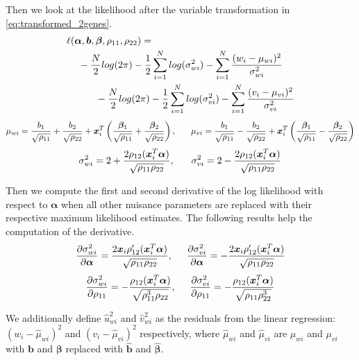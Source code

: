 \documentclass[aoas,preprint]{imsart}
\numberwithin{equation}{section}
\theoremstyle{plain}
\begin{document}
Then we look at the likelihood after the variable transformation in \ref{eq:transformed_2genes}.
\begin{equation}
\begin{multlined}
\ell(\bm{\alpha}, \bm{b}, \bm{\beta}, \rho_{11}, \rho_{22}) = \\
-\frac{N}{2} log(2\pi) - \frac{1}{2} \sum_{i=1}^{N} log (\sigma_{wi}^2) - \sum_{i=1}^{N} \frac{(w_i - \mu_{wi})^2}{\sigma_{wi}^2}\\
\hspace{7mm} -\frac{N}{2} log(2\pi) - \frac{1}{2} \sum_{i=1}^{N} log (\sigma_{vi}^2) - \sum_{i=1}^{N} \frac{(v_i - \mu_{vi})^2}{\sigma_{vi}^2}
\end{multlined}
    \label{eq:likelihood_2genes_appendix}
\end{equation}
$$\mu_{wi} = \frac{{b}_1}{\sqrt{\rho_{11}}} + \frac{{b}_2}{\sqrt{\rho_{22}}} + \bm{x}_i^T \left(\frac{\bm{\beta}_1}{\sqrt{\rho_{11}}} + \frac{\bm{\beta}_2}{\sqrt{\rho_{22}}}\right), \hspace{6mm} 
\mu_{vi} = \frac{{b}_1}{\sqrt{\rho_{11}}} - \frac{{b}_2}{\sqrt{\rho_{22}}} + \bm{x}_i^T \left(\frac{\bm{\beta}_1}{\sqrt{\rho_{11}}} - \frac{\bm{\beta}_2}{\sqrt{\rho_{22}}}\right)$$
$$\sigma_{wi}^2 = 2 + \frac{2\rho_{12}(\bm{x}_i^T \bm{\alpha})}{\sqrt{\rho_{11}\rho_{22}}}, \hspace{6mm} \sigma_{vi}^2 = 2 - \frac{2\rho_{12}(\bm{x}_i^T \bm{\alpha})}{\sqrt{\rho_{11}\rho_{22}}}$$

Then we compute the first and second derivative of the log likelihood with respect to $\bm{\alpha}$ when all other nuisance parameters are replaced with their respective maximum likelihood estimates. The following results help the computation of the derivative.
$$
\frac{\partial \sigma_{wi}^2}{\partial \bm{\alpha}} = \frac{2\bm{x}_i \rho_{12}'(\bm{x}_i^T \bm{\alpha})}{\sqrt{\rho_{11}\rho_{22}}}, \hspace{5mm}
\frac{\partial \sigma_{vi}^2}{\partial \bm{\alpha}} = -\frac{2\bm{x}_i \rho_{12}'(\bm{x}_i^T \bm{\alpha})}{\sqrt{\rho_{11}\rho_{22}}}
$$
$$\frac{\partial \sigma_{wi}^2}{\partial \rho_{11}} = -\frac{\rho_{12}(\bm{x}_i^T \bm{\alpha})}{\sqrt{\rho_{11}^3\rho_{22}}}, \hspace{5mm}
\frac{\partial \sigma_{vi}^2}{\partial \rho_{11}} = -\frac{\rho_{12}(\bm{x}_i^T \bm{\alpha})}{\sqrt{\rho_{11}\rho_{22}^3}}$$

\noindent We additionally define $\hat{u}_{wi}^2$ and $\hat{v}_{wi}^2$ as the residuals from the linear regression: $(w_i - \hat{\mu}_{wi})^2$ and $(v_i-\hat{\mu}_{vi})^2$ respectively, where $\hat{\mu}_{wi}$ and $\hat{\mu}_{vi}$ are $\mu_{wi}$ and $\mu_{vi}$ with $\bm{b}$ and $\bm{\beta}$ replaced with $\hat{\bm{b}}$ and $\hat{\bm{\beta}}$.\\
\end{document}
